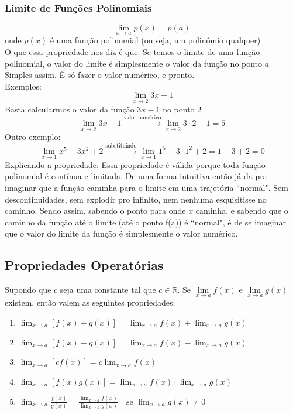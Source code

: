 \documentclass{article}
\begin{document}
\subsubsection{Limite de Funções Polinomiais}
\[
\lim_{x \to a} p(x) = p(a) 
\]
onde \(p(x)\) é uma função polinomial (ou seja, um polinômio qualquer)
\\[2pt]
O que essa propriedade nos diz é que: Se temos o limite de uma função polinomial, o valor do limite é simplesmente o valor da função no ponto $a$
\\[2pt]
Simples assim. É só fazer o valor numérico, e pronto.
\\[2pt]
Exemplos:
\[
\lim_{x \to 2} 3x-1
\]
Basta calcularmos o valor da função $3x-1$ no ponto 2
\[
\lim_{x \to 2} 3x-1 \xrightarrow{\text{valor numérico}} \lim_{x \to 2} 3 \cdot 2 - 1 = 5
\]
Outro exemplo:
\[
\lim_{x \to 1} x^5 - 3x^2 + 2 \xrightarrow{\text{substituindo}} \lim_{x \to 1} 1^5 - 3 \cdot 1^2 + 2 = 1 -3 + 2 = 0
\]
Explicando a propriedade: Essa propriedade é válida porque toda função polinomial é contínua e limitada. De uma forma intuitiva então já da pra imaginar que a função caminha para o limite em uma trajetória ``normal". Sem descontinuidades, sem explodir pro infinito, nem nenhuma esquisitisse no caminho. Sendo assim, sabendo o ponto para onde $x$ caminha, e sabendo que o caminho da função até o limite (até o ponto f(a)) é ``normal", é de se imaginar que o valor do limite da função é simplesmente o valor numérico.

\subsection{Propriedades Operatórias}
Supondo que $c$ seja uma constante tal que $c \in \mathbb{R}$. Se $\lim\limits_{x \to a}f(x)$ e $\lim\limits_{x \to a}g(x)$ existem, então valem as seguintes propriedades:
\begin{enumerate}
    \item $\displaystyle \lim_{x \to a} [f(x) + g(x)] = \lim_{x \to a} f(x) + \lim_{x \to a} g(x)$
    \item $\displaystyle \lim_{x \to a} [f(x) - g(x)] = \lim_{x \to a} f(x) - \lim_{x \to a} g(x)$
    \item $\displaystyle \lim_{x \to a} [c f(x)] = c \lim_{x \to a} f(x)$
    \item $\displaystyle \lim_{x \to a} [f(x) g(x)] = \lim_{x \to a} f(x) \cdot \lim_{x \to a} g(x)$
    \item $\displaystyle \lim_{x \to a} \frac{f(x)}{g(x)} = \frac{\displaystyle\lim_{x \to a} f(x)}{\displaystyle\lim_{x \to a} g(x)} \quad \text{se } \lim_{x \to a} g(x) \neq 0$
\end{enumerate}
 
\end{document}

